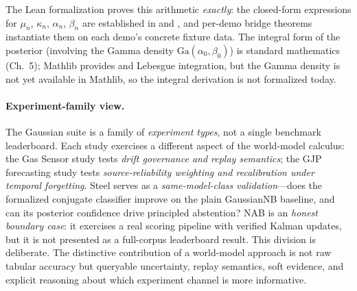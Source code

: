 \documentclass[11pt,openany]{report}
\begin{document}
The Lean formalization proves this arithmetic \emph{exactly}: the
closed-form expressions for $\mu_n$, $\kappa_n$, $\alpha_n$, $\beta_n$
are established in  and
, and per-demo bridge theorems instantiate them on each demo's
concrete fixture data.  The integral form of the posterior (involving the
Gamma density $\mathrm{Ga}(\alpha_0, \beta_0)$) is standard
mathematics~\cite{BernardoSmith2000} (Ch.~5); Mathlib provides
 and Lebesgue integration, but the Gamma
density is not yet available in Mathlib, so the integral derivation
is not formalized today.

\paragraph{Experiment-family view.}
The Gaussian suite is a family of \emph{experiment types}, not a single
benchmark leaderboard.  Each study exercises a different aspect of the
world-model calculus:
the Gas Sensor study tests \emph{drift governance and replay semantics};
the GJP forecasting study tests \emph{source-reliability weighting and
recalibration under temporal forgetting}.
Steel serves as a \emph{same-model-class validation}---does the
formalized conjugate classifier improve on the plain GaussianNB baseline,
and can its posterior confidence drive principled abstention?
NAB is an \emph{honest boundary case}: it exercises a real scoring
pipeline with verified Kalman updates, but it is not presented as a
full-corpus leaderboard result.
This division is deliberate.  The distinctive contribution of a
world-model approach is not raw tabular accuracy but queryable
uncertainty, replay semantics, soft evidence, and explicit reasoning
about which experiment channel is more informative.
\end{document}
